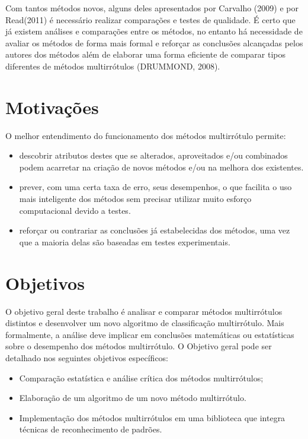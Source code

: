 Com tantos métodos novos, alguns deles apresentados por Carvalho (2009)
e por Read(2011) é necessário realizar comparações e testes de qualidade.
É certo que já existem análises e comparações entre os métodos,
no entanto há necessidade de avaliar os métodos de forma mais formal
e reforçar as conclusões alcançadas pelos autores dos métodos além de elaborar
uma forma eficiente de comparar tipos diferentes de métodos multirrótulos (DRUMMOND, 2008).

\section{Motivações}
O melhor entendimento do funcionamento dos métodos multirrótulo permite:
\begin{itemize}
 \item descobrir atributos destes que se alterados, aproveitados
 e/ou combinados podem acarretar na criação de novos métodos e/ou na melhora dos existentes.
 \item prever, com uma certa taxa de erro, seus desempenhos, o que facilita o uso mais inteligente dos métodos
 sem precisar utilizar muito esforço computacional devido a testes.
 \item reforçar ou contrariar as conclusões já estabelecidas dos métodos, uma vez que a maioria delas são 
 baseadas em testes experimentais.
\end{itemize}

\section{Objetivos}
O objetivo geral deste trabalho é analisar e comparar métodos multirrótulos distintos e 
desenvolver um novo algoritmo de classificação multirrótulo.
Mais formalmente, a análise deve implicar em conclusões matemáticas ou estatísticas sobre o desempenho dos métodos multirrótulo.
O Objetivo geral pode ser detalhado nos seguintes objetivos específicos:
\begin{itemize}
 \item Comparação estatística e análise crítica dos métodos multirrótulos;
 \item Elaboração de um algoritmo de um novo método multirrótulo.
 \item Implementação dos métodos multirrótulos em uma biblioteca que integra técnicas de reconhecimento de padrões.
\end{itemize}


